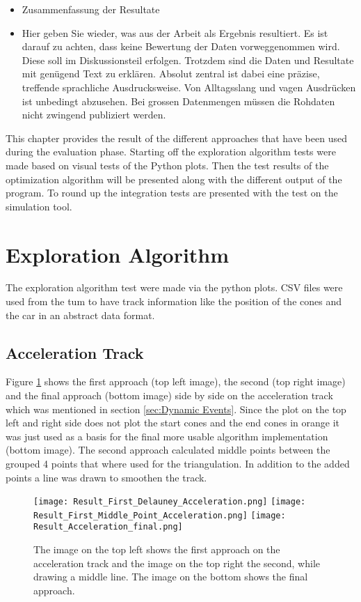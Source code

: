 \begin{itemize}
    \item Zusammenfassung der Resultate
    \item Hier geben Sie wieder, was aus der Arbeit als Ergebnis resultiert. Es ist darauf zu achten, dass keine Bewertung der Daten vorweggenommen wird. Diese soll im Diskussionsteil erfolgen. Trotzdem sind die Daten und Resultate mit genügend Text zu erklären. Absolut zentral ist dabei eine präzise, treffende sprachliche Ausdrucksweise. Von Alltagsslang und vagen Ausdrücken ist unbedingt abzusehen.
          Bei grossen Datenmengen müssen die Rohdaten nicht zwingend publiziert werden.
\end{itemize}

This chapter provides the result of the different approaches that have been used during the evaluation phase. Starting off the exploration algorithm tests were made based on visual tests of the Python plots. Then the test results of the optimization algorithm will be presented along with the different output of the program. To round up the integration tests are presented with the test on the simulation tool.

\section{Exploration Algorithm}
The exploration algorithm test were made via the python plots. CSV files were used from the \acrlong{tum} to have track information like the position of the cones and the car in an abstract data format. \cite{tumftm_optimization_algoritm} 

\subsection{Acceleration Track} \label{sec:Results Acceleration Track}
Figure \ref{fig:Result acceleration} shows the first approach (top left image), the second (top right image) and the final approach (bottom image) side by side on the acceleration track which was mentioned in section \ref{sec:Dynamic Events}. Since the plot on the top left and right side does not plot the start cones and the end cones in orange it was just used as a basis for the final more usable algorithm implementation (bottom image). The second approach calculated middle points between the grouped 4 points that where used for the triangulation. In addition to the added points a line was drawn to smoothen the track.

\begin{figure}[H]
    \centering
    \texttt{[image: Result\_First\_Delauney\_Acceleration.png]}\hfill
    \texttt{[image: Result\_First\_Middle\_Point\_Acceleration.png]}
    \texttt{[image: Result\_Acceleration\_final.png]}
    \caption{The image on the top left shows the first approach on the acceleration track and the image on the top right the second, while drawing a middle line. The image on the bottom shows the final approach.}
    \label{fig:Result acceleration}
\end{figure}

